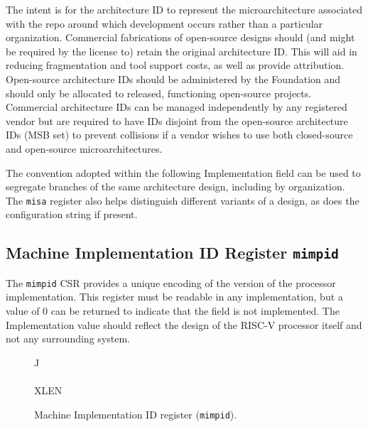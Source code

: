 \begin{commentary}
The intent is for the architecture ID to represent the
microarchitecture associated with the repo around which development
occurs rather than a particular organization.  Commercial fabrications
of open-source designs should (and might be required by the license
to) retain the original architecture ID.  This will aid in reducing
fragmentation and tool support costs, as well as provide attribution.
Open-source architecture IDs should be administered by the Foundation
and should only be allocated to released, functioning open-source
projects.  Commercial architecture IDs can be managed independently by
any registered vendor but are required to have IDs disjoint from the
open-source architecture IDs (MSB set) to prevent collisions if a
vendor wishes to use both closed-source and open-source
microarchitectures.

The convention adopted within the following Implementation field can
be used to segregate branches of the same architecture design,
including by organization.  The {\tt misa} register also helps
distinguish different variants of a design, as does the configuration
string if present.
\end{commentary}

\subsection{Machine Implementation ID Register {\tt mimpid}}

The {\tt mimpid} CSR provides a unique encoding of the version of the
processor implementation.  This register must be readable in any
implementation, but a value of 0 can be returned to indicate that the
field is not implemented.  The Implementation value should reflect the
design of the RISC-V processor itself and not any surrounding system.

\begin{figure*}[h!]
{\footnotesize
\begin{center}
\begin{tabular}{J}
 \\
\hline
{}  \\
\hline
XLEN \\
\end{tabular}
\end{center}
}
\vspace{-0.1in}
\caption{Machine Implementation ID register ({\tt mimpid}).}
\label{mimpidreg}
\end{figure*}

